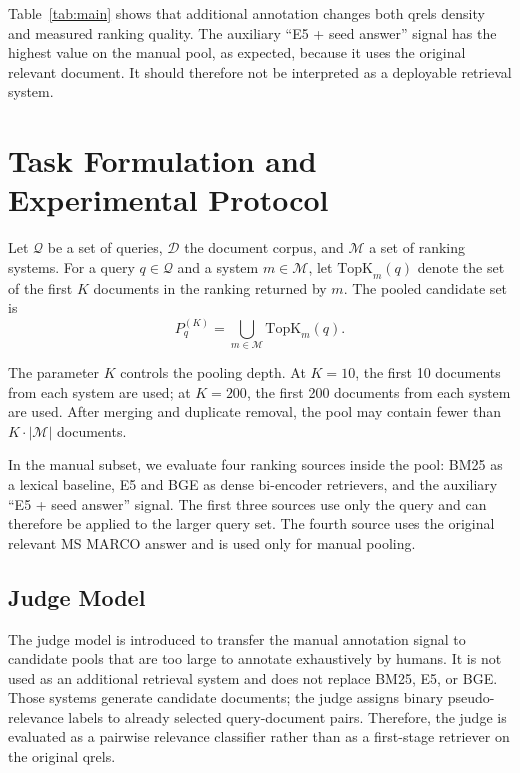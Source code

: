 \documentclass[runningheads,a4paper]{llncs}
\begin{document}
Table~\ref{tab:main} shows that additional annotation changes both qrels density and measured ranking quality. The auxiliary ``E5 + seed answer'' signal has the highest value on the manual pool, as expected, because it uses the original relevant document. It should therefore not be interpreted as a deployable retrieval system.

\section{Task Formulation and Experimental Protocol}

Let $\mathcal{Q}$ be a set of queries, $\mathcal{D}$ the document corpus, and $\mathcal{M}$ a set of ranking systems. For a query $q \in \mathcal{Q}$ and a system $m \in \mathcal{M}$, let $\mathrm{TopK}_m(q)$ denote the set of the first $K$ documents in the ranking returned by $m$. The pooled candidate set is
\begin{equation}
\label{eq:pool}
P_q^{(K)} = \bigcup_{m \in \mathcal{M}} \mathrm{TopK}_m(q).
\end{equation}

The parameter $K$ controls the pooling depth. At $K=10$, the first 10 documents from each system are used; at $K=200$, the first 200 documents from each system are used. After merging and duplicate removal, the pool may contain fewer than $K \cdot |\mathcal{M}|$ documents.

In the manual subset, we evaluate four ranking sources inside the pool: BM25 as a lexical baseline, E5 and BGE as dense bi-encoder retrievers, and the auxiliary ``E5 + seed answer'' signal. The first three sources use only the query and can therefore be applied to the larger query set. The fourth source uses the original relevant MS MARCO answer and is used only for manual pooling.

\subsection{Judge Model}

The judge model is introduced to transfer the manual annotation signal to candidate pools that are too large to annotate exhaustively by humans. It is not used as an additional retrieval system and does not replace BM25, E5, or BGE. Those systems generate candidate documents; the judge assigns binary pseudo-relevance labels to already selected query-document pairs. Therefore, the judge is evaluated as a pairwise relevance classifier rather than as a first-stage retriever on the original qrels.
\end{document}
